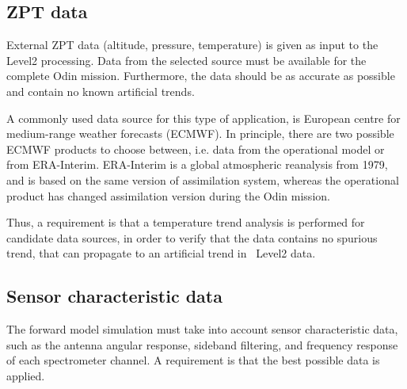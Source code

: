 \subsection{ZPT data}
External ZPT data (altitude, pressure, temperature) is given as input
to the Level2 processing. Data from the selected source must be available
for the complete Odin mission. Furthermore, the data should be as accurate
as possible %
and contain no known artificial trends.

A commonly used data source for this type of application, is
European centre for medium-range weather forecasts (ECMWF).
In principle, there are two possible ECMWF products to choose
between, i.e. data from the operational model or from   
ERA-Interim. ERA-Interim is a global atmospheric reanalysis from 1979,
and is based on the same version of assimilation system,
whereas the operational product has changed assimilation
version during the Odin mission. 
 
Thus, a requirement is that a temperature trend analysis is performed
for candidate data sources, in order to verify that the data contains
no spurious trend, that can propagate to an artificial trend in
\smr\ Level2 data.
 

\subsection{Sensor characteristic data}  
The forward model simulation must take into account sensor characteristic data,
such as the antenna angular response, sideband filtering, and frequency response 
of each spectrometer channel. A requirement is that the best possible
data is applied. 



